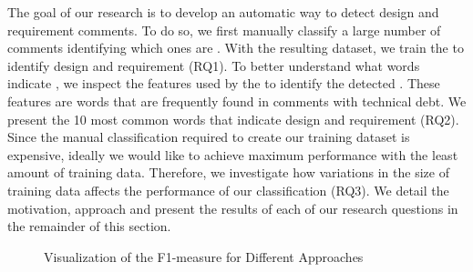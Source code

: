 The goal of our research is to develop an automatic way to detect design and requirement \SATD comments. To do so, we first manually classify a large number of comments identifying which ones are \SATD. With the resulting dataset, we train the  to identify design and requirement \SATD (RQ1). To better understand what words indicate \SATD, we inspect the features used by the  to identify the detected \SATD. These features are words that are frequently found in comments with technical debt. We present the 10 most common words that indicate design and requirement \SATD (RQ2). Since the manual classification required to create our training dataset is expensive, ideally we would like to achieve maximum performance with the least amount of training data. Therefore, we investigate how variations in the size of training data affects the performance of our classification (RQ3). We detail the motivation, approach and present the results of each of our research questions in the remainder of this section. 

\begin{figure}[!thb]
  \centering
  \vspace{-3mm}
  \caption{Visualization of the F1-measure for Different Approaches}
\end{figure}

